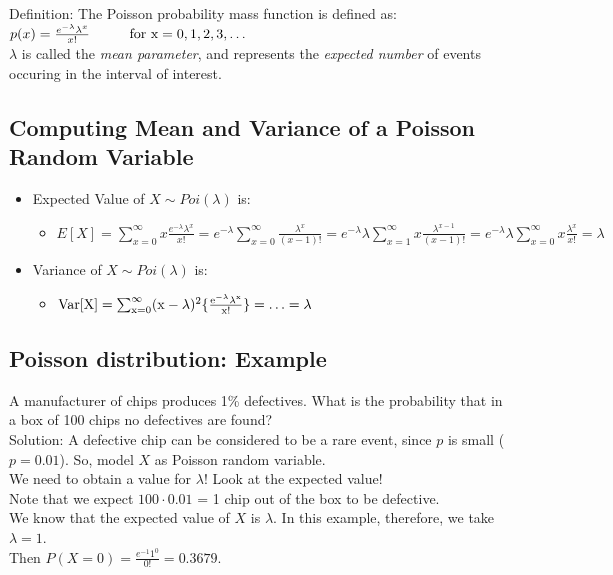 \documentclass[
  letterpaper,
  DIV=11,
  numbers=noendperiod]{scrartcl}
\providecommand{\tightlist}{%
  \setlength{\itemsep}{0pt}\setlength{\parskip}{0pt}}\usepackage{longtable,booktabs,array}
\begin{document}
{Definition:} The Poisson probability mass function is defined as:\\
\(p(x) = \frac{e^{-\lambda}\lambda^{x}}{x!} \hspace{1cm} \rm{ for }\ x = 0,1,2,3,\ldots\)\\
\(\lambda\) is called the {\emph{mean parameter}}, and represents the
\emph{expected number} of events occuring in the interval of interest.\\

\subsection{Computing Mean and Variance of a Poisson Random
Variable}\label{computing-mean-and-variance-of-a-poisson-random-variable}

\begin{itemize}
\item
  Expected Value of \(X \sim Poi({\lambda})\) is:

  \begin{itemize}
  \tightlist
  \item
    \(E[X]= \sum_{x=0}^{\infty} x\frac{e^{-\lambda}\lambda^{x}}{x!} = e^{-\lambda}\sum\limits_{x=0}^\infty\frac{\lambda^x}{(x-1)!}=e^{-\lambda}\lambda\sum\limits_{x=1}^\infty x\frac{\lambda^{x-1}}{(x-1)!}= e^{-\lambda}\lambda\sum\limits_{x=0}^\infty x\frac{\lambda^x}{x!}=\lambda\)
  \end{itemize}
\item
  Variance of \(X \sim Poi({\lambda})\) is:

  \begin{itemize}
  \tightlist
  \item
    \(\rm{Var}[X] =\sum_{x=0}^{\infty} (x-\lambda)^2 \{\frac{e^{-\lambda}\lambda^{x}}{x!}\} =\ldots = \lambda\)
  \end{itemize}
\end{itemize}

\subsection{Poisson distribution:
Example}\label{poisson-distribution-example}

A manufacturer of chips produces 1\% defectives. What is the probability
that in a box of 100 chips no defectives are found?\\
{Solution:} A defective chip can be considered to be a rare event, since
\(p\) is small (\(p = 0.01\)). So, model \(X\) as {Poisson} random
variable.\\
{We need to obtain a value for \(\lambda\)! Look at the expected
value!}\\
Note that we expect \(100 \cdot 0.01\) = 1 chip out of the box to be
defective.\\
{We know that the expected value of \(X\) is \(\lambda\). In this
example, therefore, we take \(\lambda = 1\).}\\
Then \(P(X=0) = \frac{e^{-1}1^{0}}{0!} = 0.3679.\)
\end{document}
